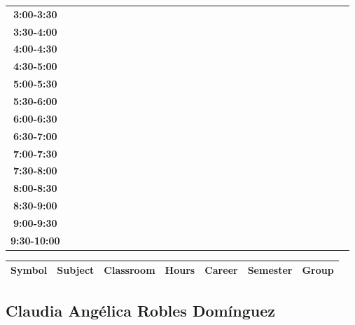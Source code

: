 \documentclass{article}
\begin{document}
\begin{table}[ht]
\begin{tabular}{|c|c|c|c|c|c|c|c|c|c|c|c|c|c|c|c|c|c|c|c|c|c|c|c|c|c|c|c|c|c|}
\textbf{3:00-3:30} &   &   &   &   &   &   &   \\
 \cline{1-8} 
\textbf{3:30-4:00} &   &   &   &   &   &   &   \\
 \cline{1-8} 
\textbf{4:00-4:30} &   &   &   &   &   &   &   \\
 \cline{1-8} 
\textbf{4:30-5:00} &   &   &   &   &   &   &   \\
 \cline{1-8} 
\textbf{5:00-5:30} &   &   &   &   &   &   &   \\
 \cline{1-8} 
\textbf{5:30-6:00} &   &   &   &   &   &   &   \\
 \cline{1-8} 
\textbf{6:00-6:30} &   &   &   &   &   &   &   \\
 \cline{1-8} 
\textbf{6:30-7:00} &   &   &   &   &   &   &   \\
 \cline{1-8} 
\textbf{7:00-7:30} &   &   &   &   &   &   &   \\
 \cline{1-8} 
\textbf{7:30-8:00} &   &   &   &   &   &   &   \\
 \cline{1-8} 
\textbf{8:00-8:30} &   &   &   &   &   &   &   \\
 \cline{1-8} 
\textbf{8:30-9:00} &   &   &   &   &   &   &   \\
 \cline{1-8} 
\textbf{9:00-9:30} &   &   &   &   &   &   &   \\
 \cline{1-8} 
\textbf{9:30-10:00} &   &   &   &   &   &   &   \\
 \cline{1-8} 
\end{tabular}\end{table}

        
        \begin{tabular}{|>{\centering\arraybackslash}m{2cm}|>{\centering\arraybackslash}m{4cm}|>{\centering\arraybackslash}m{2cm}|>{\centering\arraybackslash}m{2cm}|>{\centering\arraybackslash}m{2cm}|>{\centering\arraybackslash}m{2cm}|>{\centering\arraybackslash}m{2cm}|}
        \hline
        \textbf{Symbol} & \textbf{Subject} & \textbf{Classroom} & \textbf{Hours} & \textbf{Career} & \textbf{Semester} & \textbf{Group} \\
        \hline
        \end{tabular}
                    

        \newpage
        

        \subsection{Claudia Ang\'elica Robles Dom\'inguez}
        \vspace*{.1cm}
        
\end{document}
